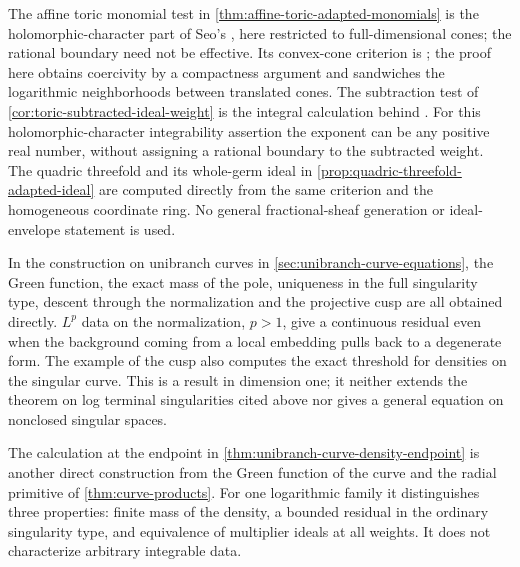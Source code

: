 The affine toric monomial test in \cref{thm:affine-toric-adapted-monomials} is the holomorphic-character part of Seo's \cite[v1, Theorem~6.1, pp.~28--29]{SeoToricIdeals26}, here restricted to full-dimensional cones; the rational boundary need not be effective. Its convex-cone criterion is \cite[v1, Lemma~4.4 and Theorem~4.6, pp.~18--19]{SeoToricIdeals26}; the proof here obtains coercivity by a compactness argument and sandwiches the logarithmic neighborhoods between translated cones. The subtraction test of \cref{cor:toric-subtracted-ideal-weight} is the integral calculation behind \cite[v1, Proposition~5.10 and Corollary~6.3, pp.~27 and~30]{SeoToricIdeals26}. For this holomorphic-character integrability assertion the exponent can be any positive real number, without assigning a rational boundary to the subtracted weight. The quadric threefold and its whole-germ ideal in \cref{prop:quadric-threefold-adapted-ideal} are computed directly from the same criterion and the homogeneous coordinate ring. No general fractional-sheaf generation or ideal-envelope statement is used.

In the construction on unibranch curves in \cref{sec:unibranch-curve-equations}, the Green function, the exact mass of the pole, uniqueness in the full singularity type, descent through the normalization and the projective cusp are all obtained directly. $L^p$ data on the normalization, $p>1$, give a continuous residual even when the background coming from a local embedding pulls back to a degenerate form. The example of the cusp also computes the exact threshold for densities on the singular curve. This is a result in dimension one; it neither extends the theorem on log terminal singularities cited above nor gives a general equation on nonclosed singular spaces.

The calculation at the endpoint in \cref{thm:unibranch-curve-density-endpoint} is another direct construction from the Green function of the curve and the radial primitive of \cref{thm:curve-products}. For one logarithmic family it distinguishes three properties: finite mass of the density, a bounded residual in the ordinary singularity type, and equivalence of multiplier ideals at all weights. It does not characterize arbitrary integrable data.

